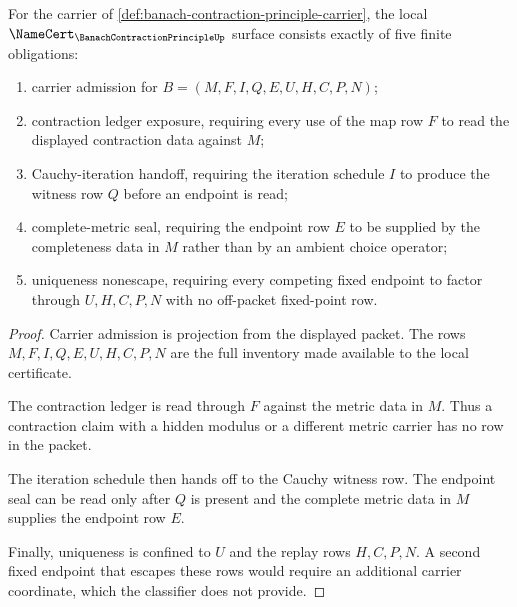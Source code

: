 \begin{theorem}
\label{thm:banach-contraction-principle-namecert-obligations}
For the carrier of
\autoref{def:banach-contraction-principle-carrier}, the local
$\NameCert_{\BanachContractionPrincipleUp}$ surface consists exactly of five
finite obligations:
\begin{enumerate}
\item carrier admission for $B=(M,F,I,Q,E,U,H,C,P,N)$;
\item contraction ledger exposure, requiring every use of the map row $F$ to read the displayed contraction data against $M$;
\item Cauchy-iteration handoff, requiring the iteration schedule $I$ to produce the witness row $Q$ before an endpoint is read;
\item complete-metric seal, requiring the endpoint row $E$ to be supplied by the completeness data in $M$ rather than by an ambient choice operator;
\item uniqueness nonescape, requiring every competing fixed endpoint to factor through $U,H,C,P,N$ with no off-packet fixed-point row.
\end{enumerate}
\end{theorem}
\begin{proof}
Carrier admission is projection from the displayed packet. The rows
$M,F,I,Q,E,U,H,C,P,N$ are the full inventory made available to the local
certificate.

The contraction ledger is read through $F$ against the metric data in $M$.
Thus a contraction claim with a hidden modulus or a different metric carrier
has no row in the packet.

The iteration schedule then hands off to the Cauchy witness row. The endpoint
seal can be read only after $Q$ is present and the complete metric data in $M$
supplies the endpoint row $E$.

Finally, uniqueness is confined to $U$ and the replay rows $H,C,P,N$. A second
fixed endpoint that escapes these rows would require an additional carrier
coordinate, which the classifier does not provide.
\end{proof}

